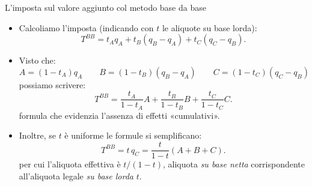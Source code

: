 \documentclass[aspectratio=149,11pt,italian]{beamer}
\begin{document}
\begin{frame}{L'imposta sul valore aggiunto col metodo base da base}
\begin{itemize}
\item Calcoliamo l'imposta (indicando con $t$ le aliquote su base lorda):
\begin{equation*}
T^{BB} = t_Aq_A + t_B(q_B-q_A) + t_C(q_C-q_B).
\end{equation*}
\item Visto che:
\begin{equation*}
A=(1-t_A)q_A\qquad B=(1-t_B)(q_B-q_A)\qquad C=(1-t_C)(q_C-q_B)
\end{equation*}
possiamo scrivere:
\begin{equation*}
  T^{BB} = \frac{t_A}{1-t_A}A + \frac{t_B}{1-t_B}B +\frac{t_C}{1-t_C}C.
\end{equation*}
formula che evidenzia l'assenza di effetti «cumulativi».
\item Inoltre, se $t$ è uniforme le formule si semplificano:
\begin{equation*}
  T^{BB} = t\,q_C = \frac{t}{1-t}(A + B+ C).
\end{equation*}
per cui l'aliquota effettiva è $t/(1-t)$, aliquota \emph{su base netta}
corrispondente all'aliquota legale \emph{su base lorda} $t$.
\end{itemize}
\end{frame}
\end{document}
